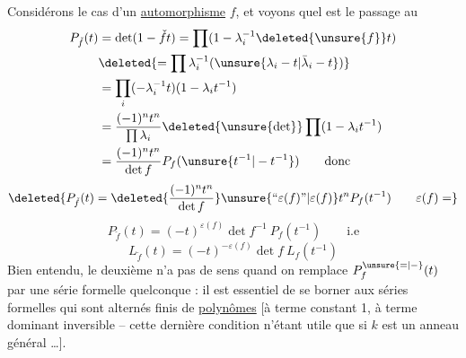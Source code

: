 Considérons le cas d'un \uline{automorphisme} $f$, et voyons quel est le passage au 
\[
\begin{aligned}
P_{\check f}(t)&=\det(1-\check f t)=\prod(1-\lambda_i^{-1}\deleted{\unsure{f}}t)\\
&\deleted{=\prod\lambda_i^{-1}(\unsure{\lambda_i-t|\bar\lambda_i-t})}\\
&=\prod_i(-\lambda_i^{-1}t)(1-\lambda_i t^{-1})\\
&=\frac{(-1)^nt^n}{\prod\lambda_i}\deleted{\unsure{\det}}\prod(1-\lambda_i t^{-1})\\
&=\frac{(-1)^nt^n}{\det f}P_f(\unsure{t^{-1}|-t^{-1}})\qquad\text{donc}
\end{aligned}
\]
\[
\deleted{P_{\check f}(t)=\deleted{\frac{(-1)^nt^n}{\det f}}\unsure{\text{``}\varepsilon(f)\text{''}|{\varepsilon(f)}}t^n P_f(t^{-1})\qquad\varepsilon(f)=}
\]
\[
\boxed{P_{\check f}(t)=(-t)^{\varepsilon(f)}\det f^{-1}\ P_f(t^{-1})}\qquad\text{i.e}
\]
\[
\boxed{L_{\check f}(t)=(-t)^{-\varepsilon(f)}\det f\ L_f(t^{-1})}
\]
Bien entendu, le deuxième  n'a pas de sens quand on remplace $P_f^{\unsure{=|-}}(t)$ par une série formelle quelconque : il est essentiel de se borner aux séries formelles qui sont  alternés finis de \uline{polynômes} [à terme constant 1, à terme dominant inversible -- cette dernière condition n'étant utile que si $k$ est un anneau général \ldots].

